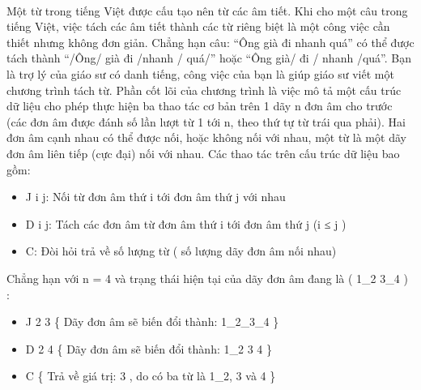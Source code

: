  

Một từ trong tiếng Việt được cấu tạo nên từ các âm tiết. Khi cho một câu trong tiếng Việt, việc tách các âm tiết thành các từ riêng biệt là một công việc cần thiết nhưng không đơn giản. Chẳng hạn câu: “Ông già đi nhanh quá” có thể được tách thành “/Ông/ già đi /nhanh / quá/” hoặc “Ông già/ đi / nhanh /quá”. Bạn là trợ lý của giáo sư có danh tiếng, công việc của bạn là giúp giáo sư viết một chương trình tách từ. Phần cốt lõi của chương trình là việc mô tả một cấu trúc dữ liệu cho phép thực hiện ba thao tác cơ bản trên 1 dãy n đơn âm cho trước (các đơn âm được đánh số lần lượt từ 1 tới n, theo thứ tự từ trái qua phải). Hai đơn âm cạnh nhau có thể được nối, hoặc không nối với nhau, một từ là một dãy đơn âm liên tiếp (cực đại) nối với nhau. Các thao tác trên cấu trúc dữ liệu bao gồm:
\begin{itemize}
	\item J i j: Nối từ đơn âm thứ i tới đơn âm thứ j với nhau
	\item D i j: Tách các đơn âm từ đơn âm thứ i tới đơn âm thứ j (i ≤ j )
	\item C: Đòi hỏi trả về số lượng từ ( số lượng dãy đơn âm nối nhau)
\end{itemize}

Chẳng hạn với n = 4 và trạng thái hiện tại của dãy đơn âm đang là ( 1\_2 3\_4 ) :
\begin{itemize}
	\item J 2 3 \{ Dãy đơn âm sẽ biến đổi thành: 1\_2\_3\_4 \}
	\item D 2 4 \{ Dãy đơn âm sẽ biến đổi thành: 1\_2 3 4 \}
	\item C \{ Trả về giá trị: 3 , do có ba từ là 1\_2, 3 và 4 \}
\end{itemize}

\